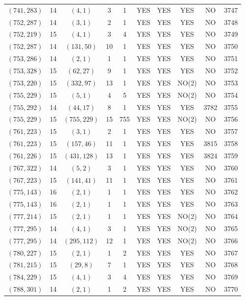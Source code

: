 \begin{longtable}{|c|c|c|c|c|c|c|c|c|c|}
$(741, 283)$ & 14 & $(4, 1)$ & 3 & 1 & YES & YES & YES & NO & 3747\\
$(752, 287)$ & 14 & $(3, 1)$ & 2 & 1 & YES & YES & YES & NO & 3748\\
$(752, 219)$ & 15 & $(4, 1)$ & 3 & 4 & YES & YES & YES & NO & 3749\\
$(752, 287)$ & 14 & $(131, 50)$ & 10 & 1 & YES & YES & YES & NO & 3750\\
$(753, 286)$ & 14 & $(2, 1)$ & 1 & 1 & YES & YES & YES & NO & 3751\\
$(753, 328)$ & 15 & $(62, 27)$ & 9 & 1 & YES & YES & YES & NO & 3752\\
$(753, 220)$ & 15 & $(332, 97)$ & 13 & 1 & YES & YES & NO(2) & NO & 3753\\
$(755, 229)$ & 15 & $(5, 1)$ & 4 & 5 & YES & YES & NO(2) & NO & 3754\\
$(755, 292)$ & 14 & $(44, 17)$ & 8 & 1 & YES & YES & YES & 3782 & 3755\\
$(755, 229)$ & 15 & $(755, 229)$ & 15 & 755 & YES & YES & NO(2) & NO & 3756\\
$(761, 223)$ & 15 & $(3, 1)$ & 2 & 1 & YES & YES & YES & NO & 3757\\
$(761, 223)$ & 15 & $(157, 46)$ & 11 & 1 & YES & YES & YES & 3815 & 3758\\
$(761, 226)$ & 15 & $(431, 128)$ & 13 & 1 & YES & YES & YES & 3824 & 3759\\
$(767, 322)$ & 14 & $(5, 2)$ & 3 & 1 & YES & YES & YES & NO & 3760\\
$(767, 223)$ & 15 & $(141, 41)$ & 11 & 1 & YES & YES & YES & NO & 3761\\
$(775, 143)$ & 16 & $(2, 1)$ & 1 & 1 & YES & YES & YES & NO & 3762\\
$(775, 143)$ & 16 & $(2, 1)$ & 1 & 1 & YES & YES & YES & NO & 3763\\
$(777, 214)$ & 15 & $(2, 1)$ & 1 & 1 & YES & YES & NO(2) & NO & 3764\\
$(777, 295)$ & 14 & $(4, 1)$ & 3 & 1 & YES & YES & NO(2) & NO & 3765\\
$(777, 295)$ & 14 & $(295, 112)$ & 12 & 1 & YES & YES & NO(2) & NO & 3766\\
$(780, 227)$ & 15 & $(2, 1)$ & 1 & 2 & YES & YES & YES & NO & 3767\\
$(781, 215)$ & 15 & $(29, 8)$ & 7 & 1 & YES & YES & YES & NO & 3768\\
$(784, 229)$ & 15 & $(4, 1)$ & 3 & 4 & YES & YES & YES & NO & 3769\\
$(788, 301)$ & 14 & $(2, 1)$ & 1 & 2 & YES & YES & YES & NO & 3770\\

\end{longtable}

